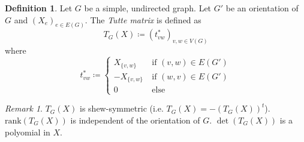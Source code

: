 \documentclass[11pt, a4paper]{article}
\theoremstyle{remark}
\newtheorem{remark}[theorem]{Remark}
\theoremstyle{definition}
\newtheorem{definition}[theorem]{Definition}
\begin{document}
\begin{definition}
	Let $G$ be a simple, undirected graph. Let $G'$ be an orientation
	of $G$ and $(X_e)_{e\in E(G)}$. The \emph{Tutte matrix} is defined as
	\[T_G(X)\coloneqq (t^*_{vw})_{v,w\in V(G)}\]
	where
	\[
		t^*_{vw}\coloneqq \begin{cases}
			X_{\{v,w\}} \quad & \text{if $(v,w)\in E(G')$} \\
			-X_{\{v,w\}}      & \text{if $(w,v)\in E(G')$} \\
			0                 & \text{else}
		\end{cases}
	\]
\end{definition}

\begin{remark}
	$T_G(X)$ is shew-symmetric (i.e. $T_G(X)=-(T_G(X))^t$).
	$\mathrm{rank}(T_G(X))$ is independent of the orientation of $G$.
	$\det(T_G(X))$ is a polyomial in $X$.
\end{remark}
\end{document}
